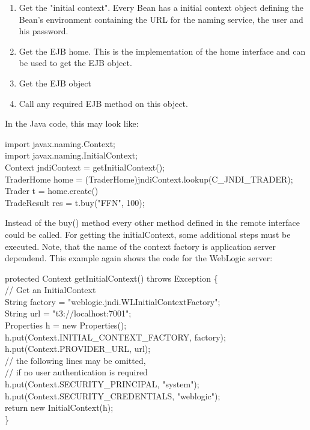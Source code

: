\begin{enumerate}
\item   Get the {\name "initial context"}. Every Bean has a  initial context
object defining the Bean's environment containing the URL for the naming
service, the user and his password.
\item Get the EJB home. This is the implementation of the home
interface and can be used to get the EJB object.
\item Get the EJB object
\item Call any required EJB method on this object.
\end{enumerate}

In the Java code, this may look like:

\begin{java}
import javax.naming.Context;\\
import javax.naming.InitialContext;\\

Context jndiContext = getInitialContext();\\
TraderHome home = (TraderHome)jndiContext.lookup(C\_JNDI\_TRADER);\\
Trader t = home.create()\\
TradeResult res = t.buy("FFN", 100);\\
\end{java}

Instead of the buy() method every other method defined in the remote
interface could be called.
For getting the initialContext, some additional steps must be executed.
Note, that the name of the context factory is application server
dependend. This example again shows the code for the WebLogic server:

\begin{java}
protected Context getInitialContext() throws Exception \{\\
\jtaba     // Get an InitialContext\\
\jtaba     String factory = "weblogic.jndi.WLInitialContextFactory";\\
\jtaba     String url = "t3://localhost:7001";\\
\jtaba     Properties h = new Properties();\\
\jtaba     h.put(Context.INITIAL\_CONTEXT\_FACTORY, factory);\\
\jtaba     h.put(Context.PROVIDER\_URL, url);\\

\jtaba     // the following lines may be omitted,\\
\jtaba     // if no user authentication is required\\
\jtaba     h.put(Context.SECURITY\_PRINCIPAL, "system");\\
\jtaba     h.put(Context.SECURITY\_CREDENTIALS, "weblogic");\\

\jtaba     return new InitialContext(h);\\
\}\\
\end{java}

